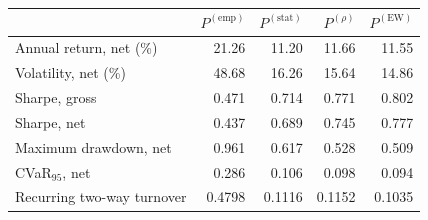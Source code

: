 \begin{tabular}{lrrrr}
\toprule
 & $P^{(\mathrm{emp})}$ & $P^{(\mathrm{stat})}$ & $P^{(\rho)}$ & $P^{(\mathrm{EW})}$ \\
\midrule
Annual return, net (\%) & 21.26 & 11.20 & 11.66 & 11.55 \\
Volatility, net (\%) & 48.68 & 16.26 & 15.64 & 14.86 \\
Sharpe, gross & 0.471 & 0.714 & 0.771 & 0.802 \\
Sharpe, net & 0.437 & 0.689 & 0.745 & 0.777 \\
Maximum drawdown, net & 0.961 & 0.617 & 0.528 & 0.509 \\
CVaR$_{95}$, net & 0.286 & 0.106 & 0.098 & 0.094 \\
Recurring two-way turnover & 0.4798 & 0.1116 & 0.1152 & 0.1035 \\
\bottomrule
\end{tabular}

